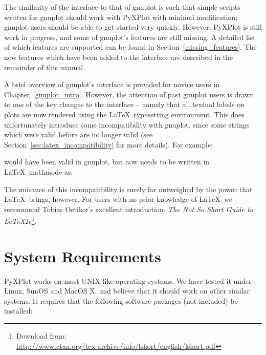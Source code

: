 The similarity of the interface to that of gnuplot is such that simple scripts
written for gnuplot should work with PyXPlot with minimal modification; gnuplot
users should be able to get started very quickly.  However, PyXPlot is still
work in progress, and some of gnuplot's features are still missing.  A detailed
list of which features are supported can be found in
Section~\ref{missing_features}. The new features which have been added to the
interface are described in the remainder of this manual.

A brief overview of gnuplot's interface is provided for novice users in
Chapter~\ref{gnuplot_intro}. However, the attention of past gnuplot users is
drawn to one of the key changes to the interface -- namely that all textual
labels on plots are now rendered using the \LaTeX\ typesetting environment. This
does unfortunately introduce some incompatibility with gnuplot, since some
strings which were valid before are no longer valid (see
Section~\ref{sec:latex_incompatibility} for more details). For example:


\noindent would have been valid in gnuplot, but now needs to be written in
\LaTeX\ mathmode as:


\noindent The nuisance of this incompatibility is surely far outweighed by the
power that \LaTeX\ brings, however. For users with no prior knowledge of
\LaTeX\ we recommend Tobias Oetiker's excellent
introduction, {\it The Not So Short Guide to \LaTeX $2\epsilon$}\footnote{Download from:\\
\url{http://www.ctan.org/tex-archive/info/lshort/english/lshort.pdf}}.

\section{System Requirements}

PyXPlot works on most UNIX-like operating systems. We have tested it under
Linux, SunOS and MacOS X, and believe that it
should work on other similar systems. It requires that the following software
packages (not included) be installed:

